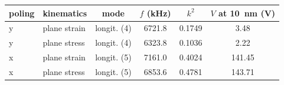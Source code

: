 \begin{tabular}{@{}llcccc@{}}
\toprule
poling & kinematics & mode & $f$ (kHz) & $k^2$ & $V$ at \SI{10}{\nano\meter} (V) \\
\midrule
y & plane strain & longit. (4) & 6721.8 & 0.1749 & 3.48 \\
y & plane stress & longit. (4) & 6323.8 & 0.1036 & 2.22 \\
x & plane strain & longit. (5) & 7161.0 & 0.4024 & 141.45 \\
x & plane stress & longit. (5) & 6853.6 & 0.4781 & 143.71 \\
\bottomrule
\end{tabular}
